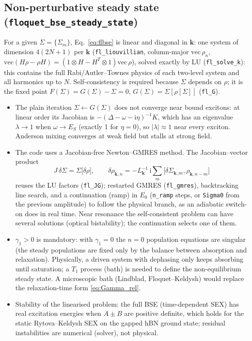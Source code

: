 \documentclass[11pt,a4paper]{article}
\newcommand{\ii}{\mathrm{i}}
\newcommand{\kk}{\bm{k}}
\newcommand{\code}[1]{\texttt{#1}}
\begin{document}
\subsection{Non-perturbative steady state (\code{floquet\_bse\_steady\_state})}
For a given $\Sigma=\{\Sigma_m\}$, Eq.~\eqref{eq:flbse} is linear and diagonal in $\kk$: one system of dimension $4(2N+1)$ per $\kk$ (\code{fl\_liouvillian},
column-major $\mathrm{vec}\,\rho_n$, $\mathrm{vec}(H\rho-\rho H)=(1\otimes H-H^{T}\otimes1)\mathrm{vec}\,\rho$), solved exactly by LU (\code{fl\_solve\_k}):
this contains the full Rabi/Autler--Townes physics of each two-level system and all harmonics up to $N$. Self-consistency is required because
$\Sigma$ depends on $\rho$; it is the fixed point $F(\Sigma)=G(\Sigma)-\Sigma=0$, $G(\Sigma)=\Sigma[\rho[\Sigma]]$ (\code{fl\_G}).
\begin{itemize}[leftmargin=1.5em]
\item The plain iteration $\Sigma\leftarrow G(\Sigma)$ does not converge near bound excitons: at linear order its Jacobian is
$-(\Delta-\omega-\ii\eta)^{-1}K$, which has an eigenvalue $\lambda\to1$ when $\omega\to E_S$ (exactly 1 for $\eta=0$), so $|\lambda|\approx1$ near every exciton.
Anderson mixing converges at weak field but stalls at strong field.
\item The code uses a Jacobian-free Newton--GMRES method. The Jacobian--vector product
\[
J\,\delta\Sigma=\Sigma\big[\delta\rho\big],\qquad \delta\rho_{\kk,n}=-L_{\kk}^{-1}\,\ii\sum_m\big[\delta\Sigma_{\kk,m},\rho_{\kk,n-m}\big]
\]
reuses the LU factors (\code{fl\_JG}); restarted GMRES (\code{fl\_gmres}), backtracking line search, and a continuation (ramp) in $E_0$
(\code{n\_ramp} steps, or \code{Sigma0} from the previous amplitude) to follow the physical branch, as an adiabatic switch-on does in real time.
Near resonance the self-consistent problem can have several solutions (optical bistability); the continuation selects one of them.
\item $\gamma_1>0$ is mandatory: with $\gamma_1=0$ the $n=0$ population equations are singular (the steady populations are fixed only by the
balance between absorption and relaxation). Physically, a driven system with dephasing only keeps absorbing until saturation; a $T_1$ process
(bath) is needed to define the non-equilibrium steady state. A microscopic bath (Lindblad, Floquet--Keldysh) would replace the
relaxation-time form \eqref{eq:Gamma_rel}.
\item Stability of the linearised problem: the full BSE (time-dependent SEX) has real excitation energies when $A\pm B$ are positive definite,
which holds for the static Rytova--Keldysh SEX on the gapped hBN ground state; residual instabilities are numerical (solver), not physical.
\end{itemize}
\end{document}

